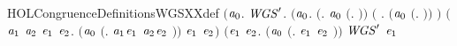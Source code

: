 \begin{SaveVerbatim}{HOLCongruenceDefinitionsWGSXXdef}
\HOLTokenTurnstile{}  \HOLSymConst{\ensuremath{=}}
   \ensuremath{(}\HOLTokenLambda{}\ensuremath{\HOLBoundVar{a}\sb{\mathrm{0}}}.
        \HOLSymConst{\HOLTokenForall{}}\ensuremath{\HOLBoundVar{WGS}\sp{\prime}}.
            \ensuremath{(}\HOLSymConst{\HOLTokenForall{}}\ensuremath{\HOLBoundVar{a}\sb{\mathrm{0}}}.
                 \ensuremath{(}\HOLSymConst{\HOLTokenExists{}}. \ensuremath{\HOLBoundVar{a}\sb{\mathrm{0}}} \HOLSymConst{\ensuremath{=}} \ensuremath{(}\HOLTokenLambda{}. \ensuremath{)}\ensuremath{)} \HOLSymConst{\HOLTokenDisj{}}
                 \ensuremath{(}\HOLSymConst{\HOLTokenExists{}} . \ensuremath{(}\ensuremath{\HOLBoundVar{a}\sb{\mathrm{0}}} \HOLSymConst{\ensuremath{=}} \ensuremath{(}\HOLTokenLambda{}. \HOLSymConst{\ensuremath{\ldotp}} \ensuremath{)}\ensuremath{)} \HOLSymConst{\HOLTokenConj{}}  \ensuremath{)} \HOLSymConst{\HOLTokenDisj{}}
                 \ensuremath{(}\HOLSymConst{\HOLTokenExists{}}\ensuremath{\HOLBoundVar{a}\sb{\mathrm{1}}} \ensuremath{\HOLBoundVar{a}\sb{\mathrm{2}}} \ensuremath{\HOLBoundVar{e}\sb{\mathrm{1}}} \ensuremath{\HOLBoundVar{e}\sb{\mathrm{2}}}.
                      \ensuremath{(}\ensuremath{\HOLBoundVar{a}\sb{\mathrm{0}}} \HOLSymConst{\ensuremath{=}} \ensuremath{(}\HOLTokenLambda{}. \ensuremath{\HOLBoundVar{a}\sb{\mathrm{1}}}\HOLSymConst{\ensuremath{\ldotp}}\ensuremath{\HOLBoundVar{e}\sb{\mathrm{1}}}  \HOLSymConst{\ensuremath{+}} \ensuremath{\HOLBoundVar{a}\sb{\mathrm{2}}}\HOLSymConst{\ensuremath{\ldotp}}\ensuremath{\HOLBoundVar{e}\sb{\mathrm{2}}} \ensuremath{)}\ensuremath{)} \HOLSymConst{\HOLTokenConj{}}
                       \ensuremath{\HOLBoundVar{e}\sb{\mathrm{1}}} \HOLSymConst{\HOLTokenConj{}}  \ensuremath{\HOLBoundVar{e}\sb{\mathrm{2}}}\ensuremath{)} \HOLSymConst{\HOLTokenDisj{}}
                 \ensuremath{(}\HOLSymConst{\HOLTokenExists{}}\ensuremath{\HOLBoundVar{e}\sb{\mathrm{1}}} \ensuremath{\HOLBoundVar{e}\sb{\mathrm{2}}}.
                      \ensuremath{(}\ensuremath{\HOLBoundVar{a}\sb{\mathrm{0}}} \HOLSymConst{\ensuremath{=}} \ensuremath{(}\HOLTokenLambda{}. \ensuremath{\HOLBoundVar{e}\sb{\mathrm{1}}}  \HOLSymConst{\ensuremath{\mid}} \ensuremath{\HOLBoundVar{e}\sb{\mathrm{2}}} \ensuremath{)}\ensuremath{)} \HOLSymConst{\HOLTokenConj{}} \ensuremath{\HOLBoundVar{WGS}\sp{\prime}} \ensuremath{\HOLBoundVar{e}\sb{\mathrm{1}}} \HOLSymConst{\HOLTokenConj{}}

\end{SaveVerbatim}
